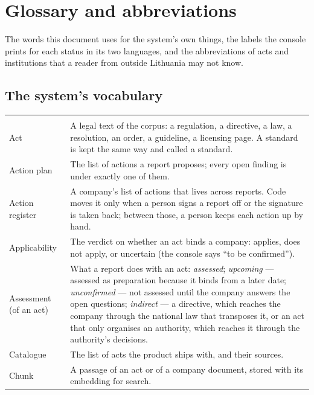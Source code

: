 \chapter{Glossary and abbreviations}\label{app:glossary}

The words this document uses for the system's own things, the labels the console prints for
each status in its two languages, and the abbreviations of acts and institutions that a reader
from outside Lithuania may not know.

\section{The system's vocabulary}\label{sec:glossary:terms}

\begin{xltabular}{\textwidth}{@{}L{36mm}Y@{}}
\toprule
{} &  \\
\midrule
\endfirsthead
\toprule
{} &  \\
\midrule
\endhead
\bottomrule
\endlastfoot
Act & A legal text of the corpus: a regulation, a directive, a law, a resolution, an order, a
  guideline, a licensing page. A standard is kept the same way and called a standard. \\
Action plan & The list of actions a report proposes; every open finding is under exactly one
  of them. \\
Action register & A company's list of actions that lives across reports. Code moves it only
  when a person signs a report off or the signature is taken back; between those, a person
  keeps each action up by hand. \\
Applicability & The verdict on whether an act binds a company: applies, does not apply, or
  uncertain (the console says \enquote{to be confirmed}). \\
Assessment (of an act) & What a report does with an act: \emph{assessed}; \emph{upcoming} ---
  assessed as preparation because it binds from a later date; \emph{unconfirmed} --- not
  assessed until the company answers the open questions; \emph{indirect} --- a directive,
  which reaches the company through the national law that transposes it, or an act that only
  organises an authority, which reaches it through the authority's decisions. \\
Catalogue & The list of acts the product ships with, and their sources. \\
Chunk & A passage of an act or of a company document, stored with its embedding for search. \\

\end{xltabular}
